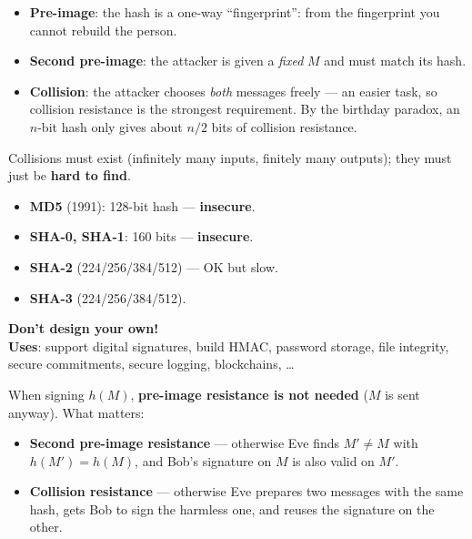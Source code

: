 \begin{rembox}[title=Understanding the three properties]
\begin{itemize}
  \item \textbf{Pre-image}: the hash is a one-way ``fingerprint'': from the fingerprint
        you cannot rebuild the person.
  \item \textbf{Second pre-image}: the attacker is given a \emph{fixed} $M$ and must
        match its hash.
  \item \textbf{Collision}: the attacker chooses \emph{both} messages freely --- an easier
        task, so collision resistance is the strongest requirement. By the birthday
        paradox, an $n$-bit hash only gives about $n/2$ bits of collision resistance.
\end{itemize}
Collisions must exist (infinitely many inputs, finitely many outputs); they must just be
\textbf{hard to find}.
\end{rembox}

\begin{propbox}[title=Standard hash functions]
\begin{itemize}
  \item \textbf{MD5} (1991): 128-bit hash --- \textbf{insecure}.
  \item \textbf{SHA-0, SHA-1}: 160 bits --- \textbf{insecure}.
  \item \textbf{SHA-2} (224/256/384/512) --- OK but slow.
  \item \textbf{SHA-3} (224/256/384/512).
\end{itemize}
\textbf{Don't design your own!} \\
\textbf{Uses}: support digital signatures, build HMAC, password storage, file integrity,
secure commitments, secure logging, blockchains, \ldots
\end{propbox}

\begin{propbox}[title=Which hash properties do signatures need?]
When signing $h(M)$, \textbf{pre-image resistance is not needed} ($M$ is sent anyway).
What matters:
\begin{itemize}
  \item \textbf{Second pre-image resistance} --- otherwise Eve finds $M' \neq M$ with
        $h(M') = h(M)$, and Bob's signature on $M$ is also valid on $M'$.
  \item \textbf{Collision resistance} --- otherwise Eve prepares two messages with the same
        hash, gets Bob to sign the harmless one, and reuses the signature on the other.
\end{itemize}
\end{propbox}

